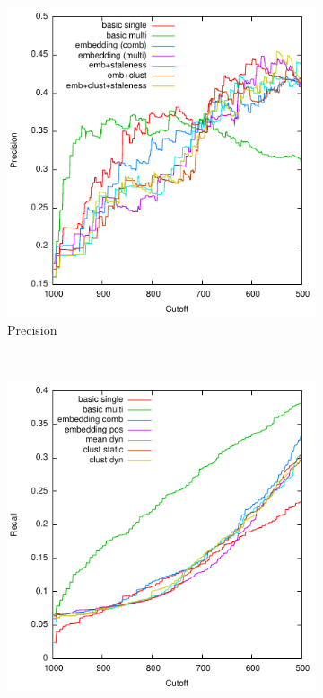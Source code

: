 \documentclass{article}
\begin{document}
{{\def \officialRunWidth {0.23\textwidth}
\begin{figure}[tb]
  \centering
    \begin{subfigure}[b]{\officialRunWidth}
            \includegraphics[width=\textwidth]{fig/official/official-prec}
			\caption{Precision}
			\label{official:prec}
    \end{subfigure}
    ~
    \begin{subfigure}[b]{\officialRunWidth}
            \includegraphics[width=\textwidth]{fig/official/official-recall}

\end{subfigure}
\end{figure}}}
\end{document}
